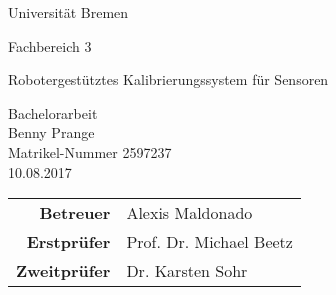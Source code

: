 
\pagestyle{empty} %

\clearscrheadings\clearscrplain
\begin{center}
\begin{Huge}
Universität Bremen\\
\vspace{3mm}
\end{Huge}
{\Large Fachbereich 3}\\

\vspace{20mm}
\begin{Large}
Robotergestütztes Kalibrierungssystem für Sensoren\\
\end{Large}
\vspace{8mm}
Bachelorarbeit\\
\vspace{0.4cm}
\vspace{2 cm}
Benny Prange \\
Matrikel-Nummer 2597237\\
10.08.2017\\
\vspace{8cm}
\begin{tabular}{rl}
{\bfseries Betreuer} & Alexis Maldonado\\
{\bfseries Erstprüfer}&Prof. Dr. Michael Beetz\\
{\bfseries Zweitprüfer}&Dr. Karsten Sohr\\
\end{tabular}

\end{center}
\clearpage


\pagestyle{useheadings} %

\tableofcontents %
\listoffigures %
\listoftables %
\clearpage















